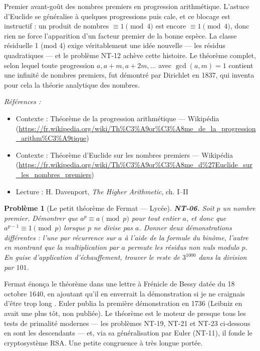 \documentclass[11pt]{article}
\newtheorem{problem}{Problème}
\newenvironment{refs}{\par\small\noindent\emph{Références :}\begin{itemize}\setlength\itemsep{0pt}}{\end{itemize}\normalsize}
\begin{document}
\noindent Premier avant-goût des nombres premiers en progression arithmétique. L'astuce
d'Euclide se généralise à quelques progressions puis cale, et ce blocage est instructif : un produit
de nombres $\equiv 1 \pmod 4$ est encore $\equiv 1 \pmod 4$, donc rien ne force l'apparition d'un
facteur premier de la bonne espèce. La classe résiduelle 1 (mod 4) exige véritablement une idée
nouvelle --- les résidus quadratiques --- et le problème NT-12 achève cette histoire. Le théorème
complet, selon lequel toute progression $a, a+m, a+2m, \ldots$ avec $\gcd(a, m) = 1$ contient
une infinité de nombres premiers, fut démontré par Dirichlet en 1837, qui inventa pour cela la
théorie analytique des nombres.

\begin{refs}
\item Contexte : Théorème de la progression arithmétique --- Wikipédia (\url{https://fr.wikipedia.org/wiki/Th%C3%A9or%C3%A8me_de_la_progression_arithm%C3%A9tique})
\item Contexte : Théorème d'Euclide sur les nombres premiers --- Wikipédia (\url{https://fr.wikipedia.org/wiki/Th%C3%A9or%C3%A8me_d%27Euclide_sur_les_nombres_premiers})
\item Lecture : H. Davenport, \textit{The Higher Arithmetic}, ch. I--II
\end{refs}

\bigskip

\begin{problem}[{Le petit théorème de Fermat --- Lycée}]
\textbf{NT-06.} Soit $p$ un nombre premier. Démontrer que
$a^p \equiv a \pmod p$ pour tout entier $a$, et donc que
$a^{p-1} \equiv 1 \pmod p$ lorsque $p$ ne divise pas $a$. Donner deux démonstrations
différentes : l'une par récurrence sur $a$ à l'aide de la formule du binôme, l'autre en montrant
que la multiplication par $a$ permute les résidus non nuls modulo $p$. En guise d'application
d'échauffement, trouver le reste de $3^{1000}$ dans la division par $101$.
\end{problem}

\noindent Fermat énonça le théorème dans une lettre à Frénicle de Bessy datée du
18 octobre 1640, en ajoutant qu'il en enverrait la démonstration \og{} si je ne craignais d'être trop
long \fg{}. Euler publia la première démonstration en 1736 (Leibniz en avait une plus tôt, non publiée).
Le théorème est le moteur de presque tous les tests de primalité modernes --- les problèmes NT-19,
NT-21 et NT-23 ci-dessous en sont les descendants --- et, via sa généralisation par Euler (NT-11), il
fonde le cryptosystème RSA. Une petite congruence à très longue portée.
\end{document}
